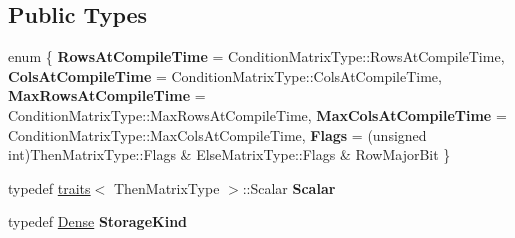 \subsection*{Public Types}
\begin{DoxyCompactItemize}
\item 
\mbox{\label{struct_eigen_1_1internal_1_1traits_3_01_select_3_01_condition_matrix_type_00_01_then_matrix_type4a832542e824e444643efa2ac02419b2_aa4e48e48faefe57cf81d4d6f0ad027a1}} 
enum \{ \newline
{\bfseries Rows\+At\+Compile\+Time} = Condition\+Matrix\+Type\+::Rows\+At\+Compile\+Time, 
{\bfseries Cols\+At\+Compile\+Time} = Condition\+Matrix\+Type\+::Cols\+At\+Compile\+Time, 
{\bfseries Max\+Rows\+At\+Compile\+Time} = Condition\+Matrix\+Type\+::Max\+Rows\+At\+Compile\+Time, 
{\bfseries Max\+Cols\+At\+Compile\+Time} = Condition\+Matrix\+Type\+::Max\+Cols\+At\+Compile\+Time, 
\newline
{\bfseries Flags} = (unsigned int)Then\+Matrix\+Type\+::Flags \& Else\+Matrix\+Type\+::Flags \& Row\+Major\+Bit
 \}
\item 
\mbox{\label{struct_eigen_1_1internal_1_1traits_3_01_select_3_01_condition_matrix_type_00_01_then_matrix_type4a832542e824e444643efa2ac02419b2_af25bcfe2b10edd4c712db322a67cf38d}} 
typedef \mbox{\hyperlink{struct_eigen_1_1internal_1_1traits}{traits}}$<$ Then\+Matrix\+Type $>$\+::Scalar {\bfseries Scalar}
\item 
\mbox{\label{struct_eigen_1_1internal_1_1traits_3_01_select_3_01_condition_matrix_type_00_01_then_matrix_type4a832542e824e444643efa2ac02419b2_af5ff0d811757bd62f57f49f9da050632}} 
typedef \mbox{\hyperlink{struct_eigen_1_1_dense}{Dense}} {\bfseries Storage\+Kind}
\item 
\mbox{\label{struct_eigen_1_1internal_1_1traits_3_01_select_3_01_condition_matrix_type_00_01_then_matrix_type4a832542e824e444643efa2ac02419b2_ad1324cdd8949a97a6842bfbf1f6b59be}} 

\end{DoxyCompactItemize}
